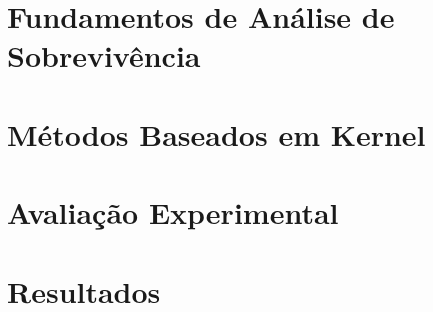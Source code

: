\documentclass[mestrado, qualificacao]{packages/icmc}
\begin{document}
\textual

% 

% 

\chapter{Fundamentos de Análise de Sobrevivência}
\label{chapter:survival-analysis}


\chapter{Métodos Baseados em Kernel}
\label{chapter:kernel_methods}


\chapter{Avaliação Experimental}
\label{chapter:methodology}


\chapter{Resultados}
\label{chapter:simulation}


% 

% 

% 
\end{document}
